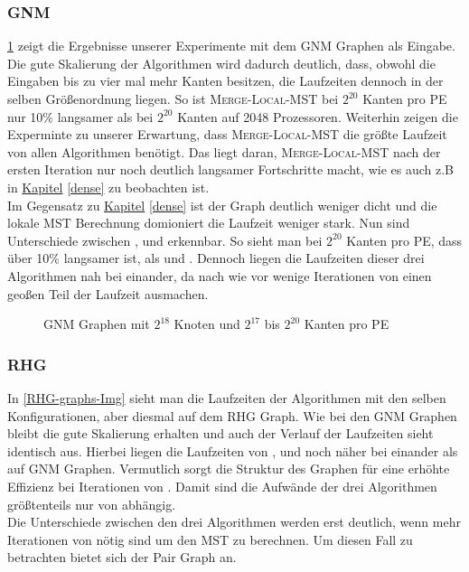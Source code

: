 \subsubsection{GNM}
\cref{GNM-graphs-Img} zeigt die Ergebnisse unserer Experimente mit dem GNM Graphen als Eingabe. \\
Die gute Skalierung der Algorithmen wird dadurch deutlich, dass, obwohl die Eingaben bis zu vier mal mehr Kanten besitzen, die Laufzeiten dennoch in der selben Größenordnung liegen. So ist \textsc{Merge-Local-MST} bei $2^{20}$ Kanten pro PE nur 10\% langsamer als bei $2^{20}$ Kanten auf 2048 Prozessoren. Weiterhin zeigen die Experminte zu unserer Erwartung, dass \textsc{Merge-Local-MST} die größte Laufzeit von allen Algorithmen benötigt. Das liegt daran, \textsc{Merge-Local-MST} nach der ersten Iteration nur noch deutlich langsamer Fortschritte macht, wie es auch z.B in \hyperref[dense]{Kapitel} \ref{dense} zu beobachten ist.\\
Im Gegensatz zu \hyperref[dense]{Kapitel} \ref{dense} ist der Graph deutlich weniger dicht
und die lokale MST Berechnung domioniert die Laufzeit weniger stark.
Nun sind Unterschiede zwischen \boruvkaAllreduce, \boruvkaThenMerge und \boruvkaMixedMerge erkennbar. So sieht man bei $2^{20}$ Kanten pro PE, dass \boruvkaAllreduce über 10\% langsamer ist, als \boruvkaThenMerge und \boruvkaMixedMerge. Dennoch liegen die Laufzeiten dieser drei Algorithmen nah bei einander, da nach wie vor wenige Iterationen von \boruvkaAllreduce einen geoßen Teil der Laufzeit ausmachen.

\begin{figure}[H]
    \centering
    
    

    
    
    \caption{GNM Graphen mit $2^{18}$ Knoten und $2^{17}$ bis $2^{20}$ Kanten pro PE}
    \label{GNM-graphs-Img}
\end{figure}


\subsubsection{RHG}
In \cref{RHG-graphs-Img} sieht man die Laufzeiten der Algorithmen mit den selben Konfigurationen, aber diesmal auf dem RHG Graph. Wie bei den GNM Graphen bleibt die gute Skalierung erhalten und auch der Verlauf der Laufzeiten sieht identisch aus. Hierbei liegen die Laufzeiten von \boruvkaAllreduceNoSpace, \boruvkaThenMerge und \boruvkaMixedMerge noch näher bei einander als auf GNM Graphen. Vermutlich sorgt die Struktur des Graphen für eine erhöhte Effizienz bei Iterationen von \boruvkaAllreduce. Damit sind die Aufwände der drei Algorithmen größtenteils nur von \boruvkaAllreduce abhängig. \\
Die Unterschiede zwischen den drei Algorithmen werden erst deutlich, wenn mehr Iterationen von \boruvkaAllreduce nötig sind um den MST zu berechnen. Um diesen Fall zu betrachten bietet sich der Pair Graph an.



